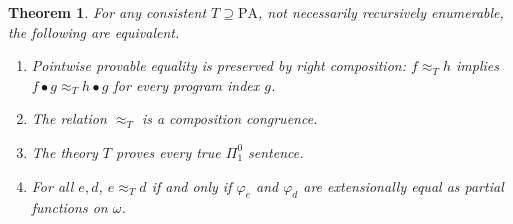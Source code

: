 \documentclass[11pt]{article}
\newtheorem{theorem}{Theorem}
\newcommand{\PA}{\mathrm{PA}}
\begin{document}
\begin{theorem}\label{thm:characterization}
For any consistent $T\supseteq\PA$, not necessarily recursively
enumerable, the following are equivalent.
\begin{enumerate}
\item\label{it:right}
Pointwise provable equality is preserved by right composition:
$f\approx_T h$ implies $f\bullet g\approx_T h\bullet g$ for every
program index $g$.
\item\label{it:congruence}
The relation $\approx_T$ is a composition congruence.
\item\label{it:pi}
The theory $T$ proves every true $\Pi^0_1$ sentence.
\item\label{it:extensional}
For all $e,d$, $e\approx_T d$ if and only if $\varphi_e$ and
$\varphi_d$ are extensionally equal as partial functions on $\omega$.
\end{enumerate}
\end{theorem}
\end{document}

